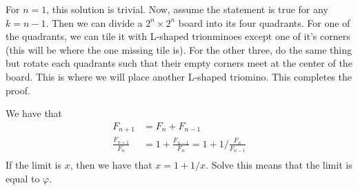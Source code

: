 \documentclass{report}
\begin{document}
\sol For $n=1$, this solution is trivial. Now, assume the statement is true for any $k = n-1$. Then we can divide a $2^n \times 2^n$ board into its four quadrants. For one of the quadrants, we can tile it with L-shaped trionminoes except one of it's corners (this will be where the one missing tile is). For the other three, do the same thing but rotate each quadrants such that their empty corners meet at the center of the board. This is where we will place another L-shaped triomino. This completes the proof.

\sol We have that 
\begin{align*}
    F_{n+1} &= F_n + F_{n-1} \\ 
    \frac{F_{n+1}}{F_n} &= 1 + \frac{F_{n-1}}{F_n} = 1 + 1 / \frac{F_n}{F_{n-1}}\\
\end{align*}
If the limit is $x$, then we have that $x = 1 + 1/x$. Solve this means that the limit is equal to $\varphi$. 
\end{document}
